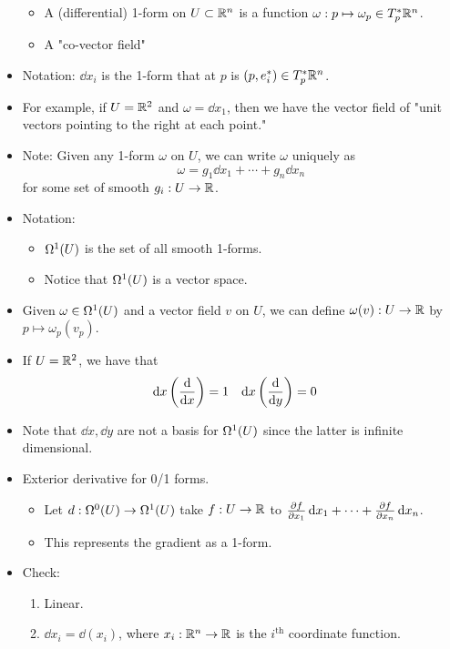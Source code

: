 \documentclass[../notes.tex]{subfiles}
\begin{document}
\begin{itemize}
\begin{itemize}
        \item A (differential) 1-form on $U\subset\R^n$ is a function $\omega:p\mapsto\omega_p\in T_p^*\R^n$.
        \item A "co-vector field"
    \end{itemize}
    \item Notation: $\dd{x_i}$ is the 1-form that at $p$ is $(p,e_i^*)\in T_p^*\R^n$.
    \item For example, if $U=\R^2$ and $\omega=\dd{x_1}$, then we have the vector field of "unit vectors pointing to the right at each point."
    \item Note: Given any 1-form $\omega$ on $U$, we can write $\omega$ uniquely as
    \begin{equation*}
        \omega = g_1\dd{x_1}+\cdots+g_n\dd{x_n}
    \end{equation*}
    for some set of smooth $g_i:U\to\R$.
    \item Notation:
    \begin{itemize}
        \item $\ome[1]{U}$ is the set of all smooth 1-forms.
        \item Notice that $\ome[1]{U}$ is a vector space.
    \end{itemize}
    \item Given $\omega\in\ome[1]{U}$ and a vector field $v$ on $U$, we can define $\omega(v):U\to\R$ by $p\mapsto\omega_p(v_p)$.
    \item If $U=\R^2$, we have that
    \begin{align*}
        \dd{x}\left( \dv{x} \right) &= 1&
        \dd{x}\left( \dv{y} \right) &= 0
    \end{align*}
    \item Note that $\dd{x},\dd{y}$ are not a basis for $\ome[1]{U}$ since the latter is infinite dimensional.
    \item Exterior derivative for 0/1 forms.
    \begin{itemize}
        \item Let $d:\ome[0]{U}\to\ome[1]{U}$ take $f:U\to\R$ to $\pdv{f}{x_1}\dd{x_1}+\cdots+\pdv{f}{x_n}\dd{x_n}$.
        \item This represents the gradient as a 1-form.
    \end{itemize}
    \item Check:
    \begin{enumerate}
        \item Linear.
        \item $\dd{x_i}=\dd{(x_i)}$, where $x_i:\R^n\to\R$ is the $i^\text{th}$ coordinate function.

\end{enumerate}
\end{itemize}
\end{document}
